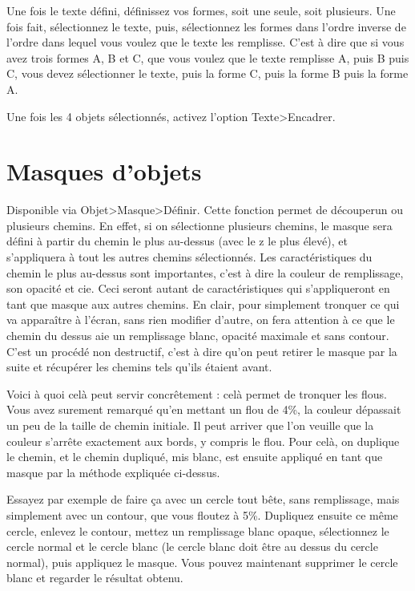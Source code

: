 \documentclass[a4paper,twoside]{article}
\begin{document}
Une fois le texte défini, définissez vos formes, soit une seule, soit plusieurs. Une fois fait, sélectionnez le texte, puis, sélectionnez les formes dans l'ordre inverse de l'ordre dans lequel vous voulez que le texte les remplisse. C'est à dire que si vous avez trois formes A, B et C, que vous voulez que le texte remplisse A, puis B puis C, vous devez sélectionner le texte, puis la forme C, puis la forme B puis la forme A.

Une fois les 4 objets sélectionnés, activez l'option Texte>Encadrer.


\section{Masques d'objets}
Disponible via Objet>Masque>Définir. Cette fonction permet de \og découper\fg un ou plusieurs chemins. En effet, si on sélectionne plusieurs chemins, le masque sera défini à partir du chemin le plus au-dessus (avec le z le plus élevé), et s'appliquera à tout les autres chemins sélectionnés. Les caractéristiques du chemin le plus au-dessus sont importantes, c'est à dire la couleur de remplissage, son opacité et cie. Ceci seront autant de caractéristiques qui s'appliqueront en tant que masque aux autres chemins. En clair, pour simplement tronquer ce qui va apparaître à l'écran, sans rien modifier d'autre, on fera attention à ce que le chemin du dessus aie un remplissage blanc, opacité maximale et sans contour. C'est un procédé non destructif, c'est à dire qu'on peut retirer le masque par la suite et récupérer les chemins tels qu'ils étaient avant.

Voici à quoi celà peut servir concrêtement : celà permet de tronquer les flous. Vous avez surement remarqué qu'en mettant un flou de 4\%, la couleur dépassait un peu de la taille de chemin initiale. Il peut arriver que l'on veuille que la couleur s'arrête exactement aux bords, y compris le flou. Pour celà, on duplique le chemin, et le chemin dupliqué, mis blanc, est ensuite appliqué en tant que masque par la méthode expliquée ci-dessus.

Essayez par exemple de faire ça avec un cercle tout bête, sans remplissage, mais simplement avec un contour, que vous floutez à 5\%. Dupliquez ensuite ce même cercle, enlevez le contour, mettez un remplissage blanc opaque, sélectionnez le cercle normal et le cercle blanc (le cercle blanc doit être au dessus du cercle normal), puis appliquez le masque. Vous pouvez maintenant supprimer le cercle blanc et regarder le résultat obtenu.
\end{document}
